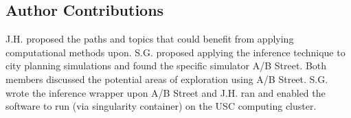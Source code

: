 \documentclass[]{article}
\begin{document}
\hypertarget{Author Contributions}{%
\subsection{Author Contributions}\label{Author Contributions}}
J.H. proposed the paths and topics that could benefit from applying computational
methods upon. S.G. proposed applying the inference technique to city planning simulations
and found the specific simulator A/B Street. Both members discussed the potential 
areas of exploration using A/B Street. S.G. wrote the inference wrapper upon A/B Street
and J.H. ran and enabled the software to run (via singularity container) on the USC 
computing cluster. 



\end{document}
